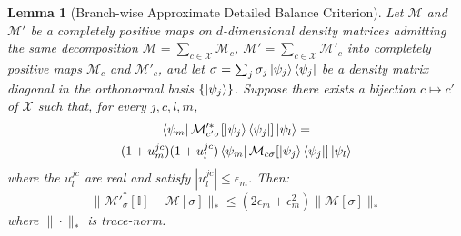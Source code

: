 \documentclass[aps,floatfix,10pt,amssymb,amsfont,amsmath,superscriptaddress,float,nofootinbib,longbibliography,nobalancelastpage,twocolumn]{revtex4-2}
\newtheorem{lemma}{Lemma}
\begin{document}
\begin{lemma}[Branch-wise Approximate Detailed Balance Criterion]
\label{lemma:1}
Let $\mathcal{M}$ and $\mathcal{M'}$ be a completely positive maps on $d$-dimensional density matrices admitting the same decomposition $\mathcal{M} = \sum_{c\in\mathcal{X}} \mathcal{M}_c$, $\mathcal{M'} = \sum_{c\in\mathcal{X}} \mathcal{M'}_c$ into completely positive maps $\mathcal{M}_c$ and $\mathcal{M}'_c$, and let $\sigma = \sum_j \sigma_j \ket{\psi_j}\bra{\psi_j}$ be a density matrix diagonal in the orthonormal basis $\{\ket{\psi_j}\}$. Suppose there exists a bijection $c \mapsto c'$ of $\mathcal{X}$ such that, for every $j,c,l,m$,
\begin{multline}
    \bra{\psi_m}\mathcal{M}'^*_{c'\sigma}[\ket{\psi_j}\bra{\psi_j}]\ket{\psi_l}
    =\\(1+u^{jc}_m)(1+ u^{jc}_l)
    \bra{\psi_m}\mathcal{M}_{c\sigma}[\ket{\psi_j}\bra{\psi_j}]\ket{\psi_l}
    \label{eq:approximate_quantum_detailed_balance_condition}
\end{multline}
where the $u^{jc}_l$ are real and satisfy $|u^{jc}_l| \leq \epsilon_m$. Then:
 \begin{equation}
    \|\mathcal{M}'^*_{\sigma}[\mathbb{I}]-\mathcal{M}[\sigma] \|_* \leq (2\epsilon_m+\epsilon_m^2)\|\mathcal{M}[\sigma]\|_* \label{eq:lemma2output}
\end{equation}
where $\|\cdot\|_*$ is trace-norm.
\end{lemma}
\end{document}
